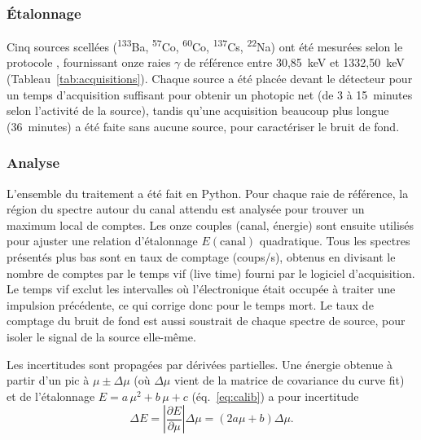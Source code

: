 \documentclass[11pt,letterpaper]{article}
\newcommand{\beq}[1]{\begin{equation} \label{#1}}
\def\enq{\end{equation}}
\begin{document}
\subsubsection*{Étalonnage}
Cinq sources scellées (\textsuperscript{133}Ba, \textsuperscript{57}Co, \textsuperscript{60}Co, \textsuperscript{137}Cs, \textsuperscript{22}Na) ont été mesurées selon le protocole \cite{protocole}, fournissant onze raies $\gamma$ de référence entre 30,85~keV et 1332,50~keV (Tableau~\ref{tab:acquisitions}). Chaque source a été placée devant le détecteur pour un temps d'acquisition suffisant pour obtenir un photopic net (de 3 à 15~minutes selon l'activité de la source), tandis qu'une acquisition beaucoup plus longue (36~minutes) a été faite sans aucune source, pour caractériser le bruit de fond.

\subsubsection*{Analyse}
L'ensemble du traitement a été fait en Python. Pour chaque raie de référence, la région du spectre autour du canal attendu est analysée pour trouver un maximum local de comptes. Les onze couples (canal, énergie) sont ensuite utilisés pour ajuster une relation d'étalonnage $E(\text{canal})$ quadratique. Tous les spectres présentés plus bas sont en taux de comptage (coups/s), obtenus en divisant le nombre de comptes par le temps vif (live time) fourni par le logiciel d'acquisition. Le temps vif exclut les intervalles où l'électronique était occupée à traiter une impulsion précédente, ce qui corrige donc pour le temps mort. Le taux de comptage du bruit de fond est aussi soustrait de chaque spectre de source, pour isoler le signal de la source elle-même.

Les incertitudes sont propagées par dérivées partielles. Une énergie obtenue à partir d'un pic à $\mu \pm \Delta\mu$ (où $\Delta\mu$ vient de la matrice de covariance du curve fit) et de l'étalonnage $E = a\,\mu^2 + b\,\mu + c$ (éq.~\ref{eq:calib}) a pour incertitude
\beq{eq:dE}
    \Delta E = \left|\frac{\partial E}{\partial \mu}\right| \Delta\mu = \left(2a\mu + b\right) \Delta\mu .
\enq
\end{document}
